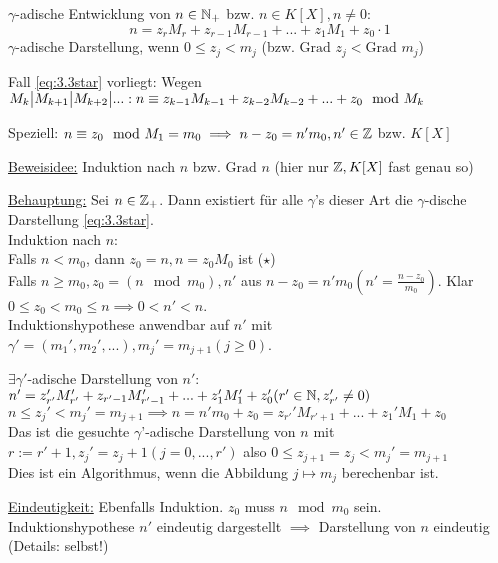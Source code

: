 \documentclass[a4paper,twoside,DIV15,BCOR12mm]{scrbook}
\begin{document}
$\gamma$-adische Entwicklung von $n \in \mathbb{N}_+$ bzw. $n \in K[X], n \not= 0:$
\begin{equation}\label{eq:3.3star}
     n = z_rM_r + z_{r-1}M_{r-1} + ... + z_1M_1 + z_0 \cdot 1
\end{equation}
$\gamma$-adische Darstellung, wenn $0 \le z_j < m_j$ (bzw.
$\text{Grad }z_j < \text{Grad }m_j$)

\begin{beweis}[Ziffernsatz]
Fall \eqref{eq:3.3star} vorliegt: Wegen $M_k \big| M_{k+1} \big| M_{k+2} \big| ...: \\
n \equiv z_{k-1}M_{k-1} + z_{k-2}M_{k-2} + ... + z_0 \mod M_k$

Speziell: $n \equiv z_0 \mod M_1 = m_0 \implies n-z_0 = n'm_0, n'
\in \mathbb{Z}$ bzw. $K[X]$

\underline{Beweisidee:} Induktion nach $n$ bzw. $\text{Grad }n$
(hier nur $\mathbb{Z}, K[X]$ fast genau so)

\underline{Behauptung:} Sei $n \in \mathbb{Z}_+$. Dann existiert für alle $\gamma$'s dieser Art die $\gamma$-dische Darstellung \eqref{eq:3.3star}.\\
Induktion nach $n$:\\
Falls $n < m_0$, dann $z_0 = n, n = z_0M_0$ ist ($\star$)\\
Falls $n \ge m_0, z_0 = (n \mod m_0), n'$ aus $n - z_0 = n'm_0 (n' = \frac{n-z_0}{m_0})$. Klar $0 \le z_0 < m_0 \le n \implies 0 < n' < n$.\\
Induktionshypothese anwendbar auf $n'$ mit $\gamma' = (m_1', m_2',
...), m_j' = m_{j+1} (j \ge 0)$.

$\exists \gamma'$-adische Darstellung von $n'$:\\
$n' = z_{r'}'M_{r'}' + z_{r'-1}M_{r'-1}' + ... + z_1'M_1' + z_0' (r' \in \mathbb{N}, z_{r'}' \not= 0)$\\
$n \le z_j' < m_j' = m_{j+1} \implies n = n'm_0 + z_0 = z_{r'}'M_{r'+1} + ... + z_1'M_1 + z_0$\\
Das ist die gesuchte $\gamma$'-adische Darstellung von $n$ mit $r := r' + 1, z_j' = z_j + 1 (j = 0, ..., r')$ also $0 \le z_{j+1} = z_j < m_j' = m_{j+1}$\\
Dies ist ein Algorithmus, wenn die Abbildung $j \mapsto m_j$
berechenbar ist.

\underline{Eindeutigkeit:} Ebenfalls Induktion. $z_0$ muss $n \mod
m_0$ sein. Induktionshypothese $n'$ eindeutig dargestellt $\implies$
Darstellung von $n$ eindeutig (Details: selbst!)
\end{beweis}
\end{document}
